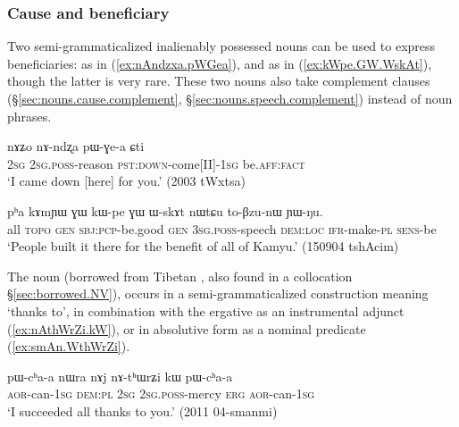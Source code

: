 \subsubsection{Cause and beneficiary} \label{sec:IPN.cause}
 
Two semi-grammaticalized inalienably possessed nouns can be used to express beneficiaries:  as in (\ref{ex:nAndzxa.pWGea}), and  as in (\ref{ex:kWpe.GW.WskAt}), though the latter is very rare. These two nouns also take complement clauses (§\ref{sec:nouns.cause.complement}, §\ref{sec:nouns.speech.complement}) instead of noun phrases.

\begin{exe}
\ex \label{ex:nAndzxa.pWGea}
\gll nɤʑo nɤ-ndʐa pɯ-ɣe-a ɕti \\
\textsc{2sg} \textsc{2sg}.\textsc{poss}-reason \textsc{pst}:\textsc{down}-come[II]-\textsc{1sg} be.\textsc{aff}:\textsc{fact} \\
\glt `I came down [here] for you.' (2003 tWxtsa)
\end{exe}

\begin{exe}
\ex \label{ex:kWpe.GW.WskAt}
\gll pʰa kɤmɲɯ ɣɯ kɯ-pe ɣɯ ɯ-skɤt nɯtɕu to-βzu-nɯ ɲɯ-ŋu. \\
all  \textsc{topo} \textsc{gen} \textsc{sbj}:\textsc{pcp}-be.good \textsc{gen} \textsc{3sg}.\textsc{poss}-speech \textsc{dem}:\textsc{loc} \textsc{ifr}-make-\textsc{pl} \textsc{sens}-be \\
\glt `People built it there for the benefit of all of Kamyu.' (150904 tshAcim)
\end{exe}

The noun  (borrowed from Tibetan , also found in a collocation §\ref{sec:borrowed.NV}), occurs in a semi-grammaticalized construction meaning `thanks to', in combination with the ergative  as an instrumental adjunct (\ref{ex:nAthWrZi.kW}), or in absolutive form as a nominal predicate (\ref{ex:smAn.WthWrZi}).

  \begin{exe}
\ex \label{ex:nAthWrZi.kW}
\gll pɯ-cʰa-a nɯra nɤj nɤ-tʰɯrʑi kɯ pɯ-cʰa-a \\
\textsc{aor}-can-\textsc{1sg} \textsc{dem}:\textsc{pl} \textsc{2sg} \textsc{2sg}.\textsc{poss}-mercy \textsc{erg} \textsc{aor}-can-\textsc{1sg} \\
\glt `I succeeded all thanks to you.' (2011 04-smanmi)
  \end{exe}

